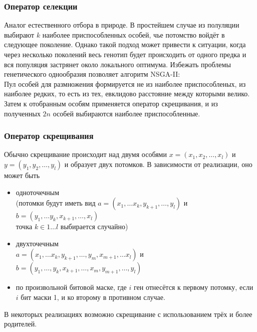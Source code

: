 \documentclass{article}
\begin{document}
        \subsubsection*{Оператор селекции}
            Аналог естественного отбора в природе. В простейшем случае из полуляции выбирают $k$ наиболее приспособленных особей, чье потомство войдёт в следующее поколение. Однако такой подход может привести к ситуации, когда через несколько поколений весь генотип будет происходить от одного предка и вся популяция застрянет около локального оптимума. Избежать проблемы генетического однообразия позволяет алгоритм NSGA-II: \\
            Пул особей для размножения формируется не из наиболее приспособленых, из наиболее редких, то есть из тех, евклидово расстояние между которыми велико. Затем к отобранным особям применяется оператор скрещивания, и из полученных $2n$ особей выбираются наиболее приспособленные. 
            
        \subsubsection*{Оператор скрещивания}
            Обычно скрещивание происходит над двумя особями $x = (x_1, x_2, \dots, x_l)$ и $y = (y_1, y_2, \dots, y_l)$ и образует двух потомков. В зависимости от реализации, оно может быть
            \begin{itemize}
                \item одноточечным \\ 
                    (потомки будут иметь вид $a = (x_1, \dots x_k, y_{k+1}, \dots, y_l)$ и $b = (y_1, \dots y_k, x_{k+1}, \dots, x_l)$ \\
                    точка $k \in 1 \dots l$ выбирается случайно)
                \item двухточечным \\
                    $a = (x_1, \dots x_k, y_{k+1}, \dots, y_m, x_{m+1}, \dots x_l)$ и $b = (y_1, \dots, y_k, x_{k+1}, \dots, x_m, y_{m+1}, \dots, y_l)$
                \item по произвольной битовой маске, где $i$ ген отнесётся к первому потомку, если $i$ бит маски 1, и ко второму в противном случае.
            \end{itemize}
            В некоторых реализациях возможно скрещивание с использованием трёх и более родителей.
\end{document}
